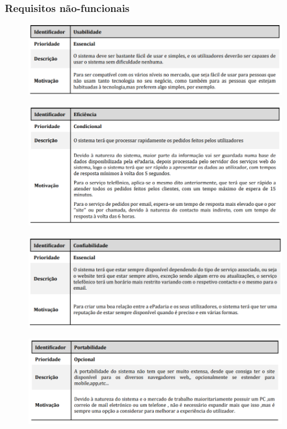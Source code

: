 \subsubsection{Requisitos não-funcionais}

\begin{figure}[H]
	\centering
	\includegraphics{requisito_nao_funcional1}
	\caption{}
	\label{fig:requisitonaofuncional1}
\end{figure}

\begin{figure}[H]
	\centering
	\includegraphics{requisito_nao_funcional2}
	\caption{}
	\label{fig:requisitonaofuncional2}
\end{figure}

\begin{figure}[H]
	\centering
	\includegraphics{requisito_nao_funcional3}
	\caption{}
	\label{fig:requisitonaofuncional3}
\end{figure}

\begin{figure}[H]
	\centering
	\includegraphics{requisito_nao_funcional4}
	\caption{}
	\label{fig:requisitonaofuncional4}
\end{figure}


